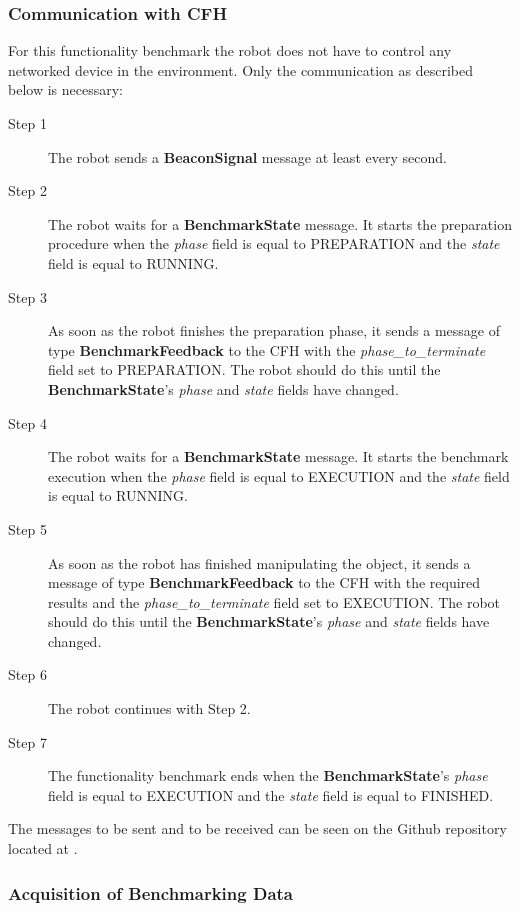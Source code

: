 \subsubsection{Communication with CFH}
\label{sssec:FBMManipulationCommCFH}

For this functionality benchmark the robot does not have to control any networked device in the environment. Only the communication as described below is necessary:

\begin{description}
\item[Step 1] The robot sends a \textbf{BeaconSignal} message at least every second.
\item[Step 2] The robot waits for a \textbf{BenchmarkState} message. It starts the preparation procedure when the \emph{phase} field is equal to PREPARATION and the \emph{state} field is equal to RUNNING.
\item[Step 3] As soon as the robot finishes the preparation phase, it sends a message of type \textbf{BenchmarkFeedback} to the CFH with the \emph{phase\_to\_terminate} field set to PREPARATION. The robot should do this until the \textbf{BenchmarkState}'s \emph{phase} and \emph{state} fields have changed.
\item[Step 4] The robot waits for a \textbf{BenchmarkState} message. It starts the benchmark execution when the \emph{phase} field is equal to EXECUTION and the \emph{state} field is equal to RUNNING.
\item[Step 5] As soon as the robot has finished manipulating the object, it sends a message of type \textbf{BenchmarkFeedback} to the CFH with the required results and the \emph{phase\_to\_terminate} field set to EXECUTION. The robot should do this until the \textbf{BenchmarkState}'s \emph{phase} and \emph{state} fields have changed.
\item[Step 6] The robot continues with Step 2.
\item[Step 7] The functionality benchmark ends when the \textbf{BenchmarkState}'s \emph{phase} field is equal to EXECUTION  and the \emph{state} field is equal to FINISHED.

\end{description}
\noindent
The messages to be sent and to be received can be seen on the Github repository located at \cite{rockin:CFHMessages}.


\subsubsection{Acquisition of Benchmarking Data}
\label{sssec:FBMManipulationData}

